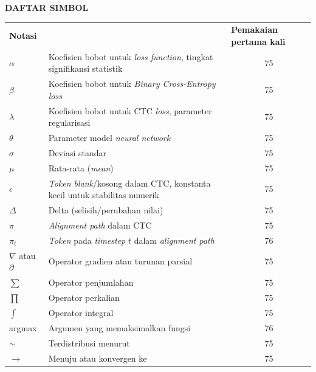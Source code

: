 \cleardoublepage
{}
\vspace{2cm}
\begin{center}
{\fontsize{14}{16.8}\selectfont\textbf{DAFTAR SIMBOL}}\\[1em]
\end{center}
\label{chap:simbol}
\setcounter{chapter}{0}
\setcounter{section}{0}
\vspace{2em}




\begin{longtable}{@{} l >{\raggedright\arraybackslash}p{6.5cm} c @{}}
\multicolumn{1}{l}{\textbf{Notasi}} & \multicolumn{1}{l}{\textbf{Deskripsi}} & \multicolumn{1}{l}{\parbox[c]{3.5cm}{\raggedright \textbf{Pemakaian pertama kali}}} \\




$\alpha$ & Koefisien bobot untuk \textit{loss function}, tingkat signifikansi statistik & 75 \\
$\beta$ & Koefisien bobot untuk \textit{Binary Cross-Entropy loss} & 75 \\
$\lambda$ & Koefisien bobot untuk CTC \textit{loss}, parameter regularisasi & 75 \\
$\theta$ & Parameter model \textit{neural network} & 75 \\
$\sigma$ & Deviasi standar & 75 \\
$\mu$ & Rata-rata (\textit{mean}) & 75 \\
$\epsilon$ & \textit{Token blank}/kosong dalam CTC, konstanta kecil untuk stabilitas numerik & 75 \\
$\Delta$ & Delta (selisih/perubahan nilai) & 75 \\
$\pi$ & \textit{Alignment path} dalam CTC & 75 \\
$\pi_t$ & \textit{Token} pada \textit{timestep} $t$ dalam \textit{alignment path} & 76 \\[1ex]


$\nabla$ atau $\partial$ & Operator gradien atau turunan parsial & 75 \\
$\sum$ & Operator penjumlahan & 75 \\
$\prod$ & Operator perkalian & 75 \\
$\int$ & Operator integral & 75 \\
argmax & Argumen yang memaksimalkan fungsi & 76 \\
$\sim$ & Terdistribusi menurut & 75 \\
$\to$ & Menuju atau konvergen ke & 75 \\[1ex]


\end{longtable}
